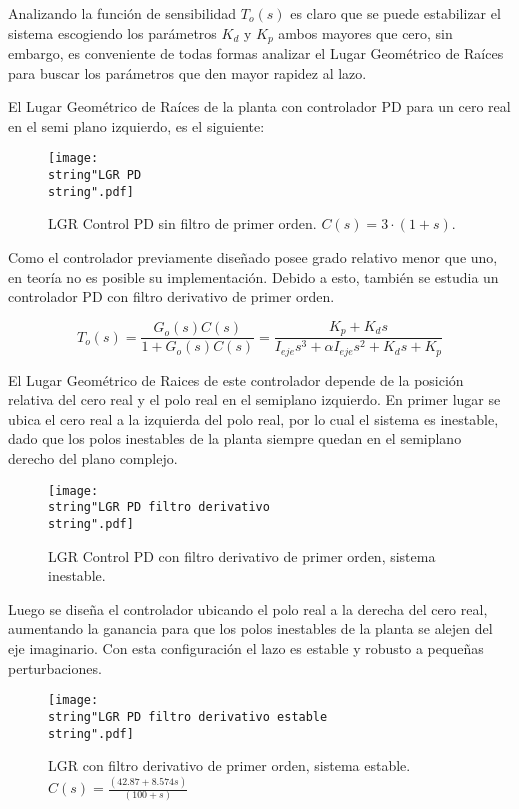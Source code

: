 \documentclass[../main.tex]{subfiles}
\begin{document}
Analizando la función de sensibilidad $T_{o}(s)$ es claro que se
puede estabilizar el sistema escogiendo los parámetros $K_{d}$ y
$K_{p}$ ambos mayores que cero, sin embargo, es conveniente de todas
formas analizar el Lugar Geométrico de Raíces para buscar los parámetros
que den mayor rapidez al lazo. 

El Lugar Geométrico de Raíces de la planta con controlador PD para
un cero real en el semi plano izquierdo, es el siguiente:

\begin{figure}[H]
\noindent \begin{centering}
\texttt{[image: \\string"LGR PD\\string".pdf]}
\par\end{centering}
\caption{LGR Control PD sin filtro de primer orden. $C(s)=3\cdot(1+s)$.}
\end{figure}

Como el controlador previamente diseñado posee grado relativo menor
que uno, en teoría no es posible su implementación. Debido a esto,
también se estudia un controlador PD con filtro derivativo de primer
orden. 

\[
T_{o}(s)=\frac{G_{o}(s)C(s)}{1+G_{o}(s)C(s)}=\frac{K_{p}+K_{d}s}{I_{eje}s^{3}+\alpha I_{eje}s^{2}+K_{d}s+K_{p}}
\]

El Lugar Geométrico de Raices de este controlador depende de la posición
relativa del cero real y el polo real en el semiplano izquierdo. En
primer lugar se ubica el cero real a la izquierda del polo real, por
lo cual el sistema es inestable, dado que los polos inestables de
la planta siempre quedan en el semiplano derecho del plano complejo. 

\begin{figure}[H]
\noindent \begin{centering}
\texttt{[image: \\string"LGR PD filtro derivativo\\string".pdf]}
\par\end{centering}
\caption{LGR Control PD con filtro derivativo de primer orden, sistema inestable.}
\end{figure}

Luego se diseña el controlador ubicando el polo real a la derecha
del cero real, aumentando la ganancia para que los polos inestables
de la planta se alejen del eje imaginario. Con esta configuración
el lazo es estable y robusto a pequeñas perturbaciones. 

\begin{figure}[H]
\noindent \begin{centering}
\texttt{[image: \\string"LGR PD filtro derivativo estable\\string".pdf]}
\par\end{centering}
\caption{LGR con filtro derivativo de primer orden, sistema estable. $C(s)=\frac{(42.87+8.574s)}{(100+s)}$ }
\end{figure}
\end{document}
